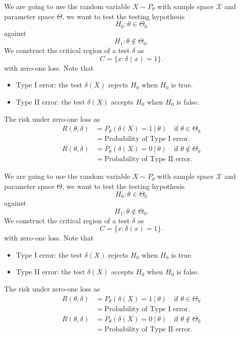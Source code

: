 \begin{example}
    We are going to use the random variable $X \sim P_\theta$ with sample space $\mathcal{X}$ and 
    parameter space $\Theta$, we want to test the testing hypothesis
    \[
        H_0 : \theta \in \Theta_0
    \]
    against 
    \[
        H_1 : \theta \notin \Theta_0.
    \]
    We construct the critical region of a test $\delta$ as  
    \[
        C = \{ x : \delta(x) = 1 \}.
    \]
    with zero-one loss. Note that 
    \begin{itemize}
        \item Type I error: the test $\delta(X)$ rejects $H_0$ when $H_0$ is true.
        \item Type II error: the test $\delta(X)$ accepts $H_0$ when $H_0$ is false.
    \end{itemize}
    
    The risk under zero-one loss as 
    \begin{align*}
        R(\theta, \delta) &= P_\theta (\delta(X) = 1 \> | \> \theta) \quad \text{if } \theta \in \Theta_0\\
        &= \text{Probability of Type I error}.
    \end{align*}
    \begin{align*}
        R(\theta, \delta) &= P_\theta (\delta(X) = 0 \> | \> \theta) \quad \text{if } \theta \notin \Theta_0\\
        &= \text{Probability of Type II error}.
    \end{align*}
\end{example}

\begin{example}
    We are going to use the random variable $X \sim P_\theta$ with sample space $\mathcal{X}$ and 
    parameter space $\Theta$, we want to test the testing hypothesis
    \[
        H_0 : \theta \in \Theta_0
    \]
    against 
    \[
        H_1 : \theta \notin \Theta_0.
    \]
    We construct the critical region of a test $\delta$ as  
    \[
        C = \{ x : \delta(x) = 1 \}.
    \]
    with zero-one loss. Note that 
    \begin{itemize}
        \item Type I error: the test $\delta(X)$ rejects $H_0$ when $H_0$ is true.
        \item Type II error: the test $\delta(X)$ accepts $H_0$ when $H_0$ is false.
    \end{itemize}
    
    The risk under zero-one loss as 
    \begin{align*}
        R(\theta, \delta) &= P_\theta (\delta(X) = 1 \> | \> \theta) \quad \text{if } \theta \in \Theta_0\\
        &= \text{Probability of Type I error}.
    \end{align*}
    \begin{align*}
        R(\theta, \delta) &= P_\theta (\delta(X) = 0 \> | \> \theta) \quad \text{if } \theta \notin \Theta_0\\
        &= \text{Probability of Type II error}.
    \end{align*}
\end{example}

